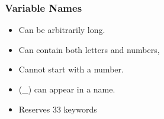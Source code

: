 


\begin{frame}[fragile]\frametitle{Variable Names}
\begin{itemize}
\item  Can be arbitrarily long. 
\item Can contain both letters and numbers, 
\item Cannot start with a number.
\item (\_) can appear in a name.
\item Reserves 33 keywords
\end{itemize}
\end{frame} 

